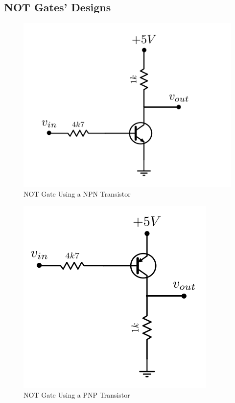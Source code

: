 \subsection{\color{purple}NOT Gates' Designs}

\begin{figure}[h!]
\centering
\includegraphics[scale=0.7]{../Exercise1/circuitoNPN}
\caption{NOT Gate Using a NPN Transistor}
\label{circNPN}
\end{figure}

\begin{figure}[h!]
\centering
\includegraphics[scale=0.7]{../Exercise1/circuitoPNP}
\caption{NOT Gate Using a PNP Transistor}
\label{circPNP}
\end{figure}

